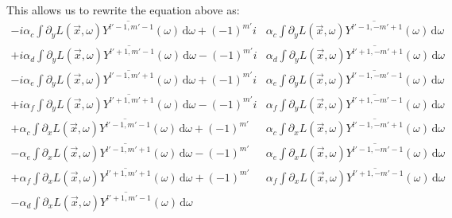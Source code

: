 \documentclass{egpubl}
\newcommand{\ud}{\,\mathrm{d}} %
\begin{document}
This allows us to rewrite the equation above as:
\begin{align*}
-i\alpha_c\int{\partial_yL\left (\vec{x} ,\omega \right )\overline{Y^{l'-1, m'-1}}(\omega )\ud\omega}
+\left({-1}\right)^{m'}i&\alpha_c\int{\partial_yL\left (\vec{x} ,\omega \right )\overline{Y^{l'-1, -m'+1}}(\omega )\ud\omega}
\\
+i\alpha_d\int{\partial_yL\left (\vec{x} ,\omega \right )\overline{Y^{l'+1, m'-1}}(\omega )\ud\omega}
-\left({-1}\right)^{m'} i &\alpha_d\int{\partial_yL\left (\vec{x} ,\omega \right )\overline{Y^{l'+1, -m'+1}}(\omega )\ud\omega}
\\
-i\alpha_e \int{\partial_yL\left (\vec{x} ,\omega \right )\overline{Y^{l'-1, m'+1}}(\omega )\ud\omega}
+\left({-1}\right)^{m'}i &\alpha_e \int{\partial_yL\left (\vec{x} ,\omega \right )\overline{Y^{l'-1, -m'-1}}(\omega )\ud\omega}
\\
+i\alpha_f \int{\partial_yL\left (\vec{x} ,\omega \right )\overline{Y^{l'+1, m'+1}}(\omega )\ud\omega}
-\left({-1}\right)^{m'}i &\alpha_f \int{\partial_yL\left (\vec{x} ,\omega \right )\overline{Y^{l'+1, -m'-1}}(\omega )\ud\omega}
\\
+\alpha_c\int{\partial_xL\left (\vec{x} ,\omega \right )\overline{Y^{l'-1, m'-1}}(\omega )\ud\omega}
+\left({-1}\right)^{m'}&\alpha_c\int{\partial_xL\left (\vec{x} ,\omega \right )\overline{Y^{l'-1, -m'+1}}(\omega )\ud\omega}
\\
-\alpha_e\int{\partial_xL\left (\vec{x} ,\omega \right )\overline{Y^{l'-1, m'+1}}(\omega )\ud\omega}
-\left({-1}\right)^{m'}&\alpha_e\int{\partial_xL\left (\vec{x} ,\omega \right )\overline{Y^{l'-1, -m'-1}}(\omega )\ud\omega}
\\
+\alpha_f\int{\partial_xL\left (\vec{x} ,\omega \right )\overline{Y^{l'+1, m'+1}}(\omega )\ud\omega}
+\left({-1}\right)^{m'}&\alpha_f\int{\partial_xL\left (\vec{x} ,\omega \right )\overline{Y^{l'+1, -m'-1}}(\omega )\ud\omega}
\\
-\alpha_d\int{\partial_xL\left (\vec{x} ,\omega \right )\overline{Y^{l'+1, m'-1}}(\omega )\ud\omega}

\end{align*}
\end{document}
